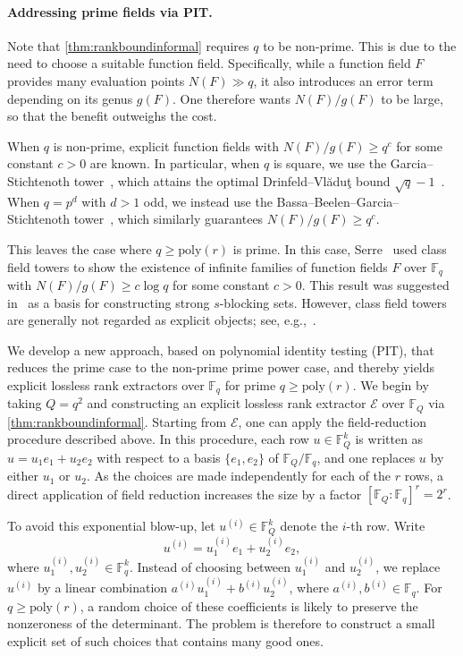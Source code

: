 \documentclass[11pt]{article}
\newcommand{\F}{\mathbb{F}}
\newcommand{\poly}{\mathrm{poly}}
\begin{document}
\paragraph{Addressing prime fields via PIT.} 

Note that \cref{thm:rankboundinformal} requires $q$ to be non-prime. This is due to the need to choose a suitable function field. Specifically, while a function field $F$ provides many evaluation points $N(F)\gg q$, it also introduces an error term depending on its genus $g(F)$. One therefore wants $N(F)/g(F)$ to be large, so that the benefit outweighs the cost.

When $q$ is non-prime, explicit function fields with $N(F)/g(F)\geq q^c$ for some constant $c>0$ are known. In particular, when $q$ is square, we use the Garcia--Stichtenoth tower~\cite{GS96}, which attains the optimal Drinfeld--Vl\u{a}du\c{t} bound $\sqrt{q}-1$~\cite{VS83}. When $q=p^d$ with $d>1$ odd, we instead use the Bassa--Beelen--Garcia--Stichtenoth tower~\cite{BBGS15}, which similarly guarantees $N(F)/g(F)\geq q^c$.

This leaves the case where $q\geq \poly(r)$ is prime. In this case, Serre~\cite{Serre} used class field towers to show the existence of infinite families of function fields $F$ over $\F_q$ with $N(F)/g(F)\geq c\log q$ for some constant $c>0$. This result was suggested in~\cite{BT24} as a basis for constructing strong $s$-blocking sets. However, class field towers are generally not regarded as explicit objects; see, e.g.,~\cite{S01}.

We develop a new approach, based on polynomial identity testing (PIT), that reduces the prime case to the non-prime prime power case, and thereby yields explicit lossless rank extractors over $\F_q$ for prime $q\geq \poly(r)$. We begin by taking $Q=q^2$ and constructing an explicit lossless rank extractor $\mathcal{E}$ over $\F_Q$ via \cref{thm:rankboundinformal}. Starting from  $\mathcal{E}$, one can apply the field-reduction procedure described above. In this procedure, each row $u\in\F_Q^k$ is written as $u=u_1 e_1+u_2 e_2$ with respect to a basis $\{e_1,e_2\}$ of $\F_Q/\F_q$, and one replaces $u$ by either $u_1$ or $u_2$. As the choices are made independently for each of the $r$ rows, a direct application of field reduction increases the size by a factor $[\F_Q:\F_q]^r=2^r$.

To avoid this exponential blow-up, let $u^{(i)}\in \F_Q^k$ denote the $i$-th row. 
Write
\[
u^{(i)} = u^{(i)}_1 e_1 + u^{(i)}_2 e_2,
\]
where $u^{(i)}_1,u^{(i)}_2 \in \F_q^k$. 
Instead of choosing between $u^{(i)}_1$ and $u^{(i)}_2$, we replace $u^{(i)}$ by a linear combination 
$a^{(i)} u^{(i)}_1 + b^{(i)} u^{(i)}_2$, where $a^{(i)}, b^{(i)} \in \F_q$. For $q\geq \poly(r)$, a random choice of these coefficients is likely to preserve the nonzeroness of the determinant. The problem is therefore to construct a small explicit set of such choices that contains many good ones.
\end{document}
